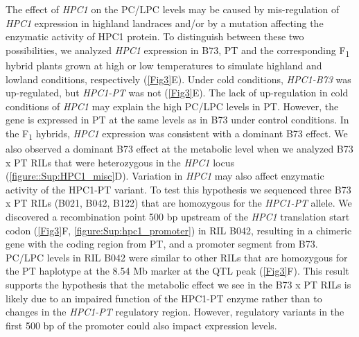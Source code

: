 \documentclass[9pt,twocolumn,twoside,lineno]{biorxiv}
\newcommand{\hpc}{\textit{HPC1}\xspace}
\begin{document}
The effect of \hpc on the PC/LPC levels may be caused by mis-regulation of \hpc expression in highland landraces and/or by a mutation affecting the enzymatic activity of HPC1 protein. 
To distinguish between these two possibilities, we analyzed \hpc expression in B73, PT and the corresponding F\textsubscript{1} hybrid plants grown at high or low temperatures to simulate highland and lowland conditions, respectively (\cref{Fig3}E). 
Under cold conditions, \textit{HPC1-B73} was up-regulated, but \textit{HPC1-PT} was not (\cref{Fig3}E). 
The lack of up-regulation in cold conditions of \hpc may explain the high PC/LPC levels in PT.
However, the gene is expressed in PT at the same levels as in B73 under control conditions.
In the F\textsubscript{1} hybrids, \hpc expression was consistent with a dominant B73 effect.
We also observed a dominant B73 effect at the metabolic level when we analyzed B73 x PT RILs that were heterozygous in the \hpc locus
(\cref{figure::Sup:HPC1_misc}D).
Variation in \hpc may also affect enzymatic activity of the HPC1-PT variant. 
To test this hypothesis we sequenced three B73 x PT RILs (B021, B042, B122) that are homozygous for the \textit{HPC1-PT} allele.
We discovered a recombination point 500 bp upstream of the \hpc translation start codon (\cref{Fig3}F, \cref{figure:Sup:hpc1_promoter}) in RIL B042, resulting in a chimeric gene with the coding region from PT, and a promoter segment from B73.
PC/LPC levels in RIL B042 were similar to other RILs that are homozygous for the PT haplotype at the 8.54 Mb marker at the QTL peak (\cref{Fig3}F). 
This result supports the hypothesis that the metabolic effect we see in the B73 x PT RILs is likely due to an impaired function of the HPC1-PT enzyme rather than to changes in the \textit{HPC1-PT} regulatory region.
However, regulatory variants in the first 500 bp of the promoter could also impact expression levels.
\end{document}
